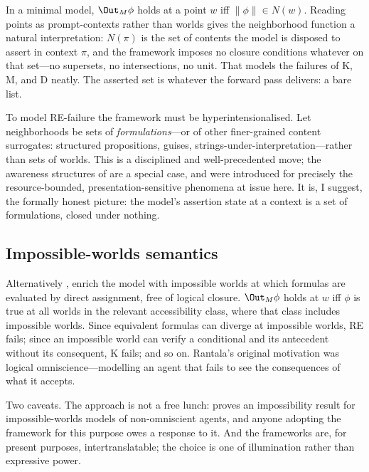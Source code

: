 In a minimal model, $\Out_M \phi$ holds at a point $w$ iff
$\lVert \phi \rVert \in N(w)$. Reading points as prompt-contexts rather than
worlds gives the neighborhood function a natural interpretation: $N(\pi)$ is the
set of contents the model is disposed to assert in context $\pi$, and the
framework imposes no closure conditions whatever on that set---no supersets, no
intersections, no unit. That models the failures of K, M, and D neatly. The
asserted set is whatever the forward pass delivers: a bare list.

To model RE-failure the framework must be hyperintensionalised. Let
neighborhoods be sets of \emph{formulations}---or of other finer-grained content
surrogates: structured propositions, guises, strings-under-interpretation---rather
than sets of worlds. This is a disciplined and well-precedented move; the
awareness structures of \citet{fagin1987} are a special case, and were introduced
for precisely the resource-bounded, presentation-sensitive phenomena at issue
here. It is, I suggest, the formally honest picture: the model's assertion state
at a context is a set of formulations, closed under nothing.

\subsection{Impossible-worlds semantics}

Alternatively \citep{rantala1982,nolan1997}, enrich the model with impossible
worlds at which formulas are evaluated by direct assignment, free of logical
closure. $\Out_M \phi$ holds at $w$ iff $\phi$ is true at all worlds in the
relevant accessibility class, where that class includes impossible worlds. Since
equivalent formulas can diverge at impossible worlds, RE fails; since an
impossible world can verify a conditional and its antecedent without its
consequent, K fails; and so on. Rantala's original motivation was logical
omniscience---modelling an agent that fails to see the consequences of what it
accepts.

Two caveats. The approach is not a free lunch: \citet{bjerring2011} proves an
impossibility result for impossible-worlds models of non-omniscient agents, and
anyone adopting the framework for this purpose owes a response to it. And the
frameworks are, for present purposes, intertranslatable; the choice is one of
illumination rather than expressive power.

